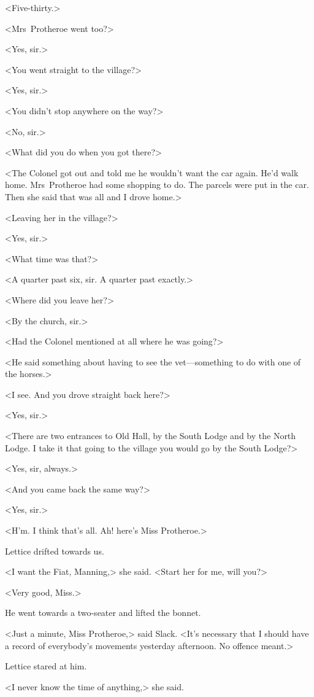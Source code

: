 <Five-thirty.>

<Mrs~Protheroe went too?>

<Yes, sir.>

<You went straight to the village?>

<Yes, sir.>

<You didn't stop anywhere on the way?>

<No, sir.>

<What did you do when you got there?>

<The Colonel got out and told me he wouldn't want the car again. He'd walk home. Mrs~Protheroe had some shopping to do. The parcels were put in the car. Then she said that was all and I drove home.>

<Leaving her in the village?>

<Yes, sir.>

<What time was that?>

<A quarter past six, sir. A quarter past exactly.>

<Where did you leave her?>

<By the church, sir.>

<Had the Colonel mentioned at all where he was going?>

<He said something about having to see the vet—something to do with one of the horses.>

<I see. And you drove straight back here?>

<Yes, sir.>

<There are two entrances to Old Hall, by the South Lodge and by the North Lodge. I take it that going to the village you would go by the South Lodge?>

<Yes, sir, always.>

<And you came back the same way?>

<Yes, sir.>

<H'm. I think that's all. Ah! here's Miss Protheroe.>

Lettice drifted towards us.

<I want the Fiat, Manning,> she said. <Start her for me, will you?>

<Very good, Miss.>

He went towards a two-seater and lifted the bonnet.

<Just a minute, Miss Protheroe,> said Slack. <It's necessary that I should have a record of everybody's movements yesterday afternoon. No offence meant.>

Lettice stared at him.

<I never know the time of anything,> she said.

